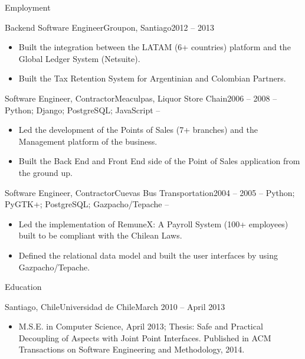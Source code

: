\documentclass[]{mcdowellcv}
\begin{document}
\begin{cvsection}{Employment}
\begin{cvsubsection}{Backend Software Engineer}{Groupon, Santiago}{2012 -- 2013}
			\begin{itemize}
				\item Built the integration between the LATAM (6+ countries) platform and the Global Ledger System (Netsuite).
				\item Built the Tax Retention System for Argentinian and Colombian Partners.
			\end{itemize}
		\end{cvsubsection}		
		\begin{cvsubsection}{Software Engineer, Contractor}{Meaculpas, Liquor Store Chain}{2006 -- 2008}
			-- Python; Django; PostgreSQL; JavaScript --
			\begin{itemize}
				\item Led the development of the Points of Sales (7+ branches) and the Management platform of the business.
				\item Built the Back End and Front End side of the Point of Sales application from the ground up.
			\end{itemize}
		\end{cvsubsection}
		\begin{cvsubsection}{Software Engineer, Contractor}{Cuevas Bus Transportation}{2004 -- 2005}
			-- Python; PyGTK+; PostgreSQL; Gazpacho/Tepache --
			\begin{itemize}
				\item Led the implementation of RemuneX: A Payroll System (100+ employees) built to be compliant with the Chilean Laws.
				\item Defined the relational data model and built the user interfaces by using Gazpacho/Tepache.
			\end{itemize}
		\end{cvsubsection}
	\end{cvsection}
	
	\begin{cvsection}{Education}
		\begin{cvsubsection}{Santiago, Chile}{Universidad de Chile}{March 2010 --  April 2013}
			\begin{itemize}
				\item M.S.E. in Computer Science, April 2013; Thesis: Safe and Practical Decoupling of Aspects with Joint Point Interfaces. Published in ACM Transactions on Software Engineering and Methodology, 2014.
			\end{itemize}
		\end{cvsubsection}
	\end{cvsection}
	
\end{document}
